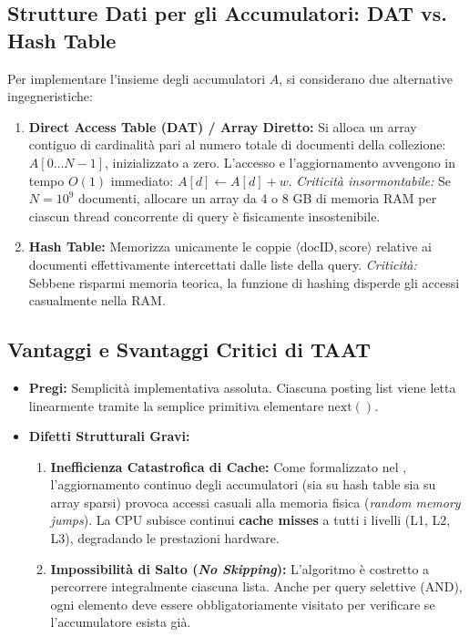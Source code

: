 \FloatBarrier
\subsection{Strutture Dati per gli Accumulatori: DAT vs. Hash Table}
Per implementare l'insieme degli accumulatori $A$, si considerano due alternative ingegneristiche:
\begin{enumerate}
    \item \textbf{Direct Access Table (DAT) / Array Diretto:} Si alloca un array contiguo di cardinalit\`a pari al numero totale di documenti della collezione: $A[0 \dots N-1]$, inizializzato a zero. L'accesso e l'aggiornamento avvengono in tempo $O(1)$ immediato: $A[d] \gets A[d] + w$.
    \textit{Criticit\`a insormontabile:} Se $N = 10^9$ documenti, allocare un array da 4 o 8 GB di memoria RAM per ciascun thread concorrente di query \`e fisicamente insostenibile.
    \item \textbf{Hash Table:} Memorizza unicamente le coppie $\langle \text{docID}, \text{score} \rangle$ relative ai documenti effettivamente intercettati dalle liste della query.
    \textit{Criticit\`a:} Sebbene risparmi memoria teorica, la funzione di hashing disperde gli accessi casualmente nella RAM.
\end{enumerate}

\FloatBarrier
\subsection{Vantaggi e Svantaggi Critici di TAAT}
\begin{itemize}
    \item \textbf{Pregi:} Semplicit\`a implementativa assoluta. Ciascuna posting list viene letta linearmente tramite la semplice primitiva elementare $\text{next}()$.
    \item \textbf{Difetti Strutturali Gravi:}
    \begin{enumerate}
        \item \textbf{Inefficienza Catastrofica di Cache:} Come formalizzato nel , l'aggiornamento continuo degli accumulatori (sia su hash table sia su array sparsi) provoca accessi casuali alla memoria fisica (\textit{random memory jumps}). La CPU subisce continui \textbf{cache misses} a tutti i livelli (L1, L2, L3), degradando le prestazioni hardware.
        \item \textbf{Impossibilit\`a di Salto (\textit{No Skipping}):} L'algoritmo \`e costretto a percorrere integralmente ciascuna lista. Anche per query selettive (AND), ogni elemento deve essere obbligatoriamente visitato per verificare se l'accumulatore esista gi\`a.
    \end{enumerate}
\end{itemize}

